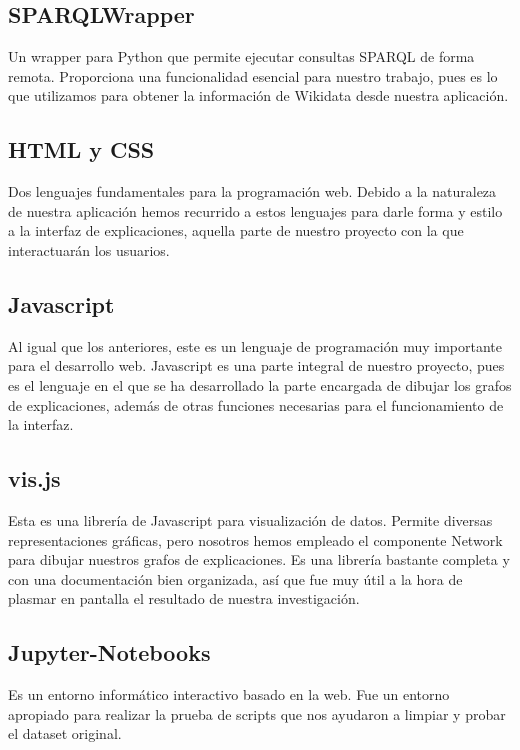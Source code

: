 \subsection*{SPARQLWrapper}

Un wrapper para Python que permite ejecutar consultas SPARQL de forma remota. Proporciona una funcionalidad esencial para nuestro trabajo, pues es lo que utilizamos para obtener la información de Wikidata desde nuestra aplicación.

\subsection*{HTML y CSS}

Dos lenguajes fundamentales para la programación web. Debido a la naturaleza de nuestra aplicación hemos recurrido a estos lenguajes para darle forma y estilo a la interfaz de explicaciones, aquella parte de nuestro proyecto con la que interactuarán los usuarios.

\subsection*{Javascript}

Al igual que los anteriores, este es un lenguaje de programación muy importante para el desarrollo web. Javascript es una parte integral de nuestro proyecto, pues es el lenguaje en el que se ha desarrollado la parte encargada de dibujar los grafos de explicaciones, además de otras funciones necesarias para el funcionamiento de la interfaz.

\subsection*{vis.js}

Esta es una librería de Javascript para visualización de datos. Permite diversas representaciones gráficas, pero nosotros hemos empleado el componente Network para dibujar nuestros grafos de explicaciones. Es una librería bastante completa y con una documentación bien organizada, así que fue muy útil a la hora de plasmar en pantalla el resultado de nuestra investigación.

\subsection*{Jupyter-Notebooks}

Es un entorno informático interactivo basado en la web. Fue un entorno apropiado para realizar la prueba de scripts que nos ayudaron a limpiar y probar el dataset original.

